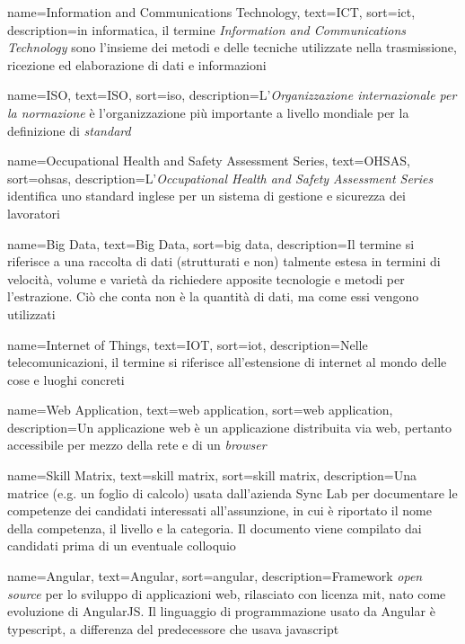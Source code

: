 {
    name=Information and Communications Technology,
    text=ICT,
    sort=ict,
    description={in informatica, il termine \emph{Information and Communications Technology} sono l'insieme dei metodi e delle tecniche utilizzate nella trasmissione, ricezione ed elaborazione di dati e informazioni}
}

{
    name=ISO,
    text=ISO,
    sort=iso,
    description={L'\emph{Organizzazione internazionale per la normazione} è l'organizzazione più importante a livello mondiale per la definizione di \textit{standard}}
}

{
    name=Occupational Health and Safety Assessment Series,
    text=OHSAS,
    sort=ohsas,
    description={L'\emph{Occupational Health and Safety Assessment Series} identifica uno standard inglese per un sistema di gestione e sicurezza dei lavoratori}
}

{
    name=Big Data,
    text=Big Data,
    sort=big data,
    description={Il termine si riferisce a una raccolta di dati (strutturati e non) talmente estesa in termini di velocità, volume e varietà da richiedere apposite tecnologie e metodi per l'estrazione. Ciò che conta non è la quantità di dati, ma come essi vengono utilizzati}
}

{
    name=Internet of Things,
    text=IOT,
    sort=iot,
    description={Nelle telecomunicazioni, il termine si riferisce all'estensione di internet al mondo delle cose e luoghi concreti}
}

{
    name=Web Application,
    text=web application,
    sort=web application,
    description={Un applicazione web è un applicazione distribuita via web, pertanto accessibile per mezzo della rete e di un \emph{browser}}
}

{
    name=Skill Matrix,
    text=skill matrix,
    sort=skill matrix,
    description={Una matrice (e.g. un foglio di calcolo) usata dall'azienda Sync Lab per documentare le competenze dei candidati interessati all'assunzione, in cui è riportato il nome della competenza, il livello e la categoria. Il documento viene compilato dai candidati prima di un eventuale colloquio}
}

{
    name=Angular,
    text=Angular,
    sort=angular,
    description={Framework \textit{open source} per lo sviluppo di applicazioni web, rilasciato con licenza \gls{mit}, nato come evoluzione di AngularJS. Il linguaggio di programmazione usato da Angular è \gls{typescript}, a differenza del predecessore che usava \gls{javascript}}
}

